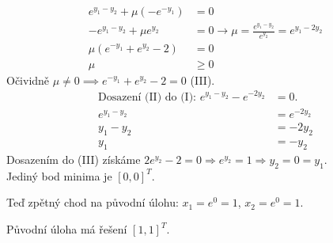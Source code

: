\begingroup
\setcounter{equation}{0}
\renewcommand{\theequation}{\Roman{equation}}
\begin{align}
    e^{y_1 - y_2} + \mu(-e^{-y_1}) &= 0 \\
    -e^{y_1 - y_2} + \mu e^{y_2} &= 0 \rightarrow \mu = \frac{e^{y_1 - y_2}}{e^{y_2}} = e^{y_1 - 2y_2} \\
    \mu(e^{-y_1} + e^{y_2} - 2) &= 0 \\
    \mu &\geq 0
\end{align}
\endgroup
Očividně $\mu \not= 0 \implies e^{-y_1} + e^{y_2} - 2 = 0$ (III).
\begin{align*}
    \text{Dosazení (II) do (I): } e^{y_1 - y_2} - e^{-2y_2} &= 0. \\
    e^{y_1 - y_2} &= e^{-2y_2} \\
    y_1 - y_2 &= -2y_2 \\
    y_1 &= -y_2
\end{align*}
Dosazením do (III) získáme $2e^{y_2} - 2 = 0 \Rightarrow e^{y_2} = 1 \Rightarrow y_2 = 0 = y_1$.\\
Jediný bod minima je $[0,0]^T$.

Teď zpětný chod na původní úlohu: $x_1 = e^0 = 1$, $x_2 = e^0 = 1$. 

Původní úloha má řešení $[1, 1]^T$.

